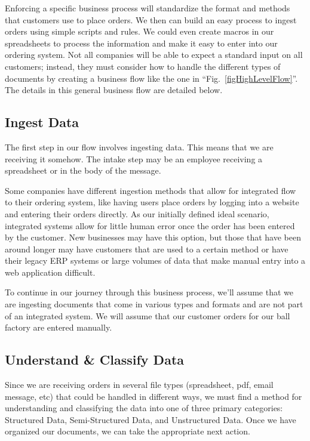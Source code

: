 \documentclass[conference]{IEEEtran}
\begin{document}
Enforcing a specific business process will standardize the format and methods that customers use to place orders. We then can build an easy process to ingest orders using simple scripts and rules. We could even create macros in our spreadsheets to process the information and make it easy to enter into our ordering system. Not all companies will be able to expect a standard input on all customers; instead, they must consider how to handle the different types of documents by creating a business flow like the one in ``Fig.~\ref{figHighLevelFlow}''. The details in this general business flow are detailed below.

\subsection{Ingest Data}
The first step in our flow involves ingesting data. This means that we are receiving it somehow. The intake step may be an employee receiving a spreadsheet or in the body of the message.

Some companies have different ingestion methods that allow for integrated flow to their ordering system, like having users place orders by logging into a website and entering their orders directly. As our initially defined ideal scenario, integrated systems allow for little human error once the order has been entered by the customer. New businesses may have this option, but those that have been around longer may have customers that are used to a certain method or have their legacy ERP systems or large volumes of data that make manual entry into a web application difficult.

To continue in our journey through this business process, we'll assume that we are ingesting documents that come in various types and formats and are not part of an integrated system. We will assume that our customer orders for our ball factory are entered manually.

\subsection{Understand \& Classify Data}
Since we are receiving orders in several file types (spreadsheet, pdf, email message, etc) that could be handled in different ways, we must find a method for understanding and classifying the data into one of three primary categories: Structured Data, Semi-Structured Data, and Unstructured Data. Once we have organized our documents, we can take the appropriate next action.
\end{document}
